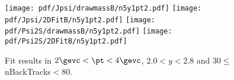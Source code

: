 \begin{figure}[H]
\begin{center}
\texttt{[image: pdf/Jpsi/drawmassB/n5y1pt2.pdf]}
\texttt{[image: pdf/Jpsi/2DFitB/n5y1pt2.pdf]}
\vspace*{-0.5cm}
\texttt{[image: pdf/Psi2S/drawmassB/n5y1pt2.pdf]}
\texttt{[image: pdf/Psi2S/2DFitB/n5y1pt2.pdf]}
\vspace*{-0.5cm}
\end{center}
\caption{Fit results in $2\gevc<\pt<4\gevc$, $2.0<y<2.8$ and 30$\leq$nBackTracks$<$80.}
\label{Fitn5y1pt2}
\end{figure}
